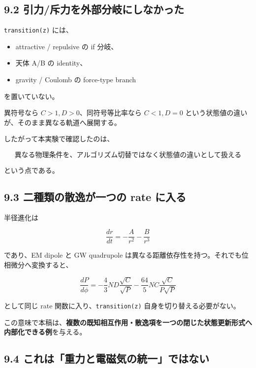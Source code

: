\documentclass[
  a4paper,
]{ltjsarticle}
\providecommand{\tightlist}{%
  \setlength{\itemsep}{0pt}\setlength{\parskip}{0pt}}
\begin{document}
\subsection{9.2
引力/斥力を外部分岐にしなかった}\label{ux5f15ux529bux65a5ux529bux3092ux5916ux90e8ux5206ux5c90ux306bux3057ux306aux304bux3063ux305f}

\texttt{transition(z)} には、

\begin{itemize}
\tightlist
\item
  attractive / repulsive の if 分岐、
\item
  天体 A/B の identity、
\item
  gravity / Coulomb の force-type branch
\end{itemize}

を置いていない。

異符号なら \(C>1,D>0\)、同符号等比率なら \(C<1,D=0\)
という状態値の違いが、そのまま異なる軌道へ展開する。

したがって本実験で確認したのは、

\[
\boxed{
\text{異なる物理条件を、アルゴリズム切替ではなく状態値の違いとして扱える}
}
\]

という点である。

\subsection{9.3 二種類の散逸が一つの rate
に入る}\label{ux4e8cux7a2eux985eux306eux6563ux9038ux304cux4e00ux3064ux306e-rate-ux306bux5165ux308b}

半径進化は

\[
\frac{dr}{dt}
=-\frac{A}{r^2}-\frac{B}{r^3}
\]

であり、EM dipole と GW quadrupole
は異なる距離依存性を持つ。それでも位相微分へ変換すると、

\[
\frac{dP}{d\phi}
=
-\frac{4}{3}ND\frac{\sqrt C}{\sqrt P}
-\frac{64}{5}NC\frac{\sqrt C}{P\sqrt P}
\]

として同じ rate 関数に入り、\texttt{transition(z)}
自身を切り替える必要がない。

この意味で本稿は、\textbf{複数の既知相互作用・散逸項を一つの閉じた状態更新形式へ内部化できる例}を与える。

\subsection{9.4
これは「重力と電磁気の統一」ではない}\label{ux3053ux308cux306fux91cdux529bux3068ux96fbux78c1ux6c17ux306eux7d71ux4e00ux3067ux306fux306aux3044}
\end{document}
